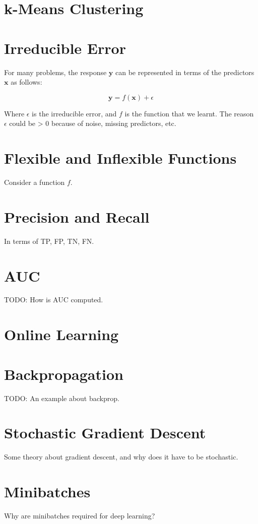 \documentclass{article}
\newcommand\mbf{\mathbf}
\begin{document}
\section{k-Means Clustering}

\section{Irreducible Error}
For many problems, the response $\mbf y$ can be represented in terms of the predictors $\mbf x$ as follows:

\begin{equation}
\mbf{y} = f(\mbf{x}) + \epsilon
\end{equation}

Where $\epsilon$ is the irreducible error, and $f$ is the function that we learnt. The reason $\epsilon$ could be > 0 because of noise, missing predictors, etc.

\section{Flexible and Inflexible Functions}
Consider a function $f$.

\section{Precision and Recall}
In terms of TP, FP, TN, FN.

\section{AUC}
TODO: How is AUC computed.

\section{Online Learning}

\section{Backpropagation}
TODO: An example about backprop.

\section{Stochastic Gradient Descent}
Some theory about gradient descent, and why does it have to be stochastic.

\section{Minibatches}
Why are minibatches required for deep learning?
\end{document}
